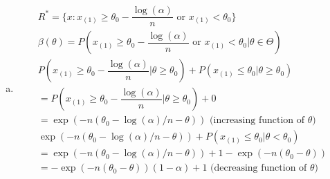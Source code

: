 \documentclass{article}
\newcommand{\B}{\beta}
\newcommand{\ta}{\theta}
\begin{document}
\begin{flushleft}
\begin{enumerate}[(a)]
	\item 
\begin{multline*}\\
R^*=\{x:x_{(1)}\geq \ta_0-\dfrac{\log(\alpha)}{n} \text{ or } x_{(1)}<\ta_0 \}\\
\B(\ta)=P\left(x_{(1)}\geq \ta_0-\dfrac{\log(\alpha)}{n} \text{ or } x_{(1)}<\ta_0|\ta \in \Theta\right)\\
P\left(x_{(1)}\geq \ta_0-\dfrac{\log(\alpha)}{n} |\ta\geq \ta_0\right)+P(x_{(1)}\leq \ta_0|\ta\geq \ta_0)\\
=P\left(x_{(1)}\geq \ta_0-\dfrac{\log(\alpha)}{n} |\ta\geq \ta_0\right)+0\\
=\exp\left(-n(\ta_0-\log(\alpha)/n-\ta)\right) \text{ (increasing function of } \ta)\\
\exp\left(-n(\ta_0-\log(\alpha)/n-\ta)\right)+P(x_{(1)}\leq \ta_0|\ta<\ta_0)\\
=\exp\left(-n(\ta_0-\log(\alpha)/n-\ta)\right)+1-\exp\left(-n(\ta_0-\ta)\right)\\
=-\exp\left(-n(\ta_0-\ta)\right)(1-\alpha)+1 \text{ (decreasing function of } \ta)\\
\end{multline*}
	
\end{enumerate}

\end{flushleft}
\end{document}
